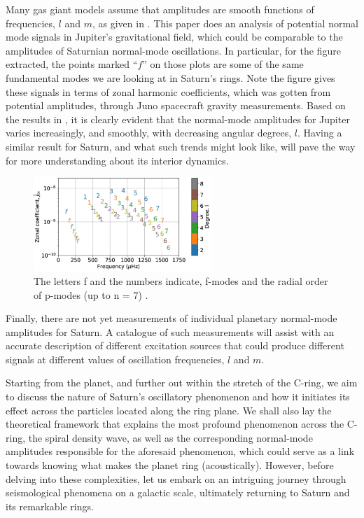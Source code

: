 \documentclass{article}
\begin{document}
Many gas giant models assume that amplitudes are smooth functions of frequencies, $l$ and $m$, as given in \cite{PMID:36042221}. This paper does an analysis of potential normal mode signals in Jupiter’s gravitational field, which could be comparable to the amplitudes of Saturnian normal-mode oscillations. In particular, for the figure extracted, the points marked $“f”$ on those plots are some of the same fundamental modes we are looking at in Saturn’s rings. Note the figure gives these signals in terms of zonal harmonic coefficients, which was gotten from potential amplitudes, through Juno spacecraft gravity measurements. Based on the results in \cite{PMID:36042221}, it is clearly evident that the normal-mode amplitudes for Jupiter varies increasingly, and smoothly, with decreasing angular degrees, $l$. Having a similar result for Saturn, and what such trends might look like, will pave the way for more understanding about its interior dynamics.
\begin{figure}[h] 
\centering
\includegraphics[width=0.6\textwidth]{durante.png}
\caption{The letters f and the numbers indicate, f-modes and the radial order of p-modes (up to n = 7) \cite{PMID:36042221}.} \label{fig:my_label}
\end{figure}

Finally, there are not yet measurements of individual planetary normal-mode amplitudes for Saturn. A catalogue of such measurements will assist with an accurate description of different excitation sources that could produce different signals at different values of oscillation frequencies, $l$ and $m$.


Starting from the planet, and further out within the stretch of the C-ring, we aim to discuss the nature of Saturn's oscillatory phenomenon and how it initiates its effect across the particles located along the ring plane. We shall also lay the theoretical framework that explains the most profound phenomenon across the C-ring, the spiral density wave, as well as the corresponding normal-mode amplitudes responsible for the aforesaid phenomenon, which could serve as a link towards knowing what makes the planet ring (acoustically). However, before delving into these complexities, let us embark on an intriguing journey through seismological phenomena on a galactic scale, ultimately returning to Saturn and its remarkable rings.
\end{document}
